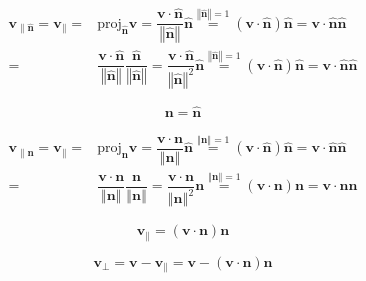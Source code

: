 \documentclass[
]{book}
\theoremstyle{definition}
\theoremstyle{definition}
\theoremstyle{definition}
\theoremstyle{definition}
\theoremstyle{remark}
\begin{document}
\[
\begin{aligned}
\boldsymbol{v}_{{\scriptscriptstyle \parallel\hat{\boldsymbol{n}}}}=\boldsymbol{v}_{{\scriptscriptstyle \parallel}}= & \mathrm{proj}_{\hat{{\scriptscriptstyle \boldsymbol{n}}}}\boldsymbol{v}=\dfrac{\boldsymbol{v}\cdot\hat{\boldsymbol{n}}}{\left\Vert \hat{\boldsymbol{n}}\right\Vert }\hat{\boldsymbol{n}}\overset{\left\Vert \hat{\boldsymbol{n}}\right\Vert =1}{=}\left(\boldsymbol{v}\cdot\hat{\boldsymbol{n}}\right)\hat{\boldsymbol{n}}=\boldsymbol{v}\cdot\hat{\boldsymbol{n}}\hat{\boldsymbol{n}}\\
= & \dfrac{\boldsymbol{v}\cdot\hat{\boldsymbol{n}}}{\left\Vert \hat{\boldsymbol{n}}\right\Vert }\dfrac{\hat{\boldsymbol{n}}}{\left\Vert \hat{\boldsymbol{n}}\right\Vert }=\dfrac{\boldsymbol{v}\cdot\hat{\boldsymbol{n}}}{\left\Vert \hat{\boldsymbol{n}}\right\Vert ^{2}}\hat{\boldsymbol{n}}\overset{\left\Vert \hat{\boldsymbol{n}}\right\Vert =1}{=}\left(\boldsymbol{v}\cdot\hat{\boldsymbol{n}}\right)\hat{\boldsymbol{n}}=\boldsymbol{v}\cdot\hat{\boldsymbol{n}}\hat{\boldsymbol{n}}
\end{aligned}
\]

\[
\boldsymbol{n}=\hat{\boldsymbol{n}}
\]

\[
\begin{aligned}
\boldsymbol{v}_{{\scriptscriptstyle \parallel\boldsymbol{n}}}=\boldsymbol{v}_{{\scriptscriptstyle \parallel}}= & \mathrm{proj}_{{\scriptscriptstyle \boldsymbol{n}}}\boldsymbol{v}=\dfrac{\boldsymbol{v}\cdot\boldsymbol{n}}{\left\Vert \boldsymbol{n}\right\Vert }\hat{\boldsymbol{n}}\overset{\left\Vert \boldsymbol{n}\right\Vert =1}{=}\left(\boldsymbol{v}\cdot\hat{\boldsymbol{n}}\right)\hat{\boldsymbol{n}}=\boldsymbol{v}\cdot\hat{\boldsymbol{n}}\hat{\boldsymbol{n}}\\
= & \dfrac{\boldsymbol{v}\cdot\boldsymbol{n}}{\left\Vert \boldsymbol{n}\right\Vert }\dfrac{\boldsymbol{n}}{\left\Vert \boldsymbol{n}\right\Vert }=\dfrac{\boldsymbol{v}\cdot\boldsymbol{n}}{\left\Vert \boldsymbol{n}\right\Vert ^{2}}\boldsymbol{n}\overset{\left\Vert \boldsymbol{n}\right\Vert =1}{=}\left(\boldsymbol{v}\cdot\boldsymbol{n}\right)\boldsymbol{n}=\boldsymbol{v}\cdot\boldsymbol{n}\boldsymbol{n}
\end{aligned}
\]

\[
\boldsymbol{v}_{{\scriptscriptstyle \parallel}}=\left(\boldsymbol{v}\cdot\boldsymbol{n}\right)\boldsymbol{n}
\]

\[
\boldsymbol{v}_{{\scriptscriptstyle \perp}}=\boldsymbol{v}-\boldsymbol{v}_{{\scriptscriptstyle \parallel}}=\boldsymbol{v}-\left(\boldsymbol{v}\cdot\boldsymbol{n}\right)\boldsymbol{n}
\]
\end{document}
